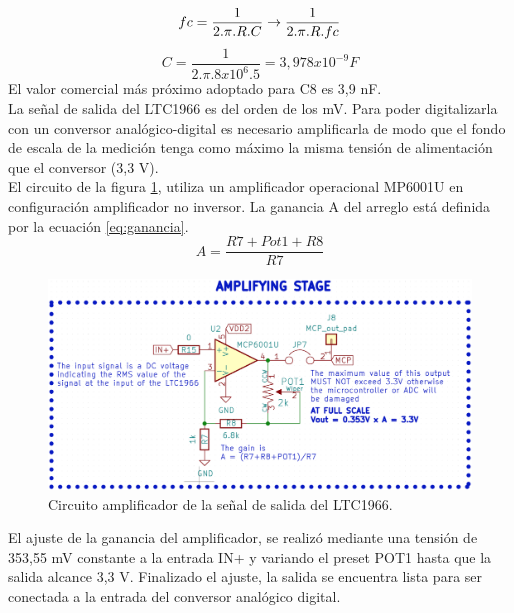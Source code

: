 \begin{equation}
	fc = \frac{1}{2.\pi.R.C}\rightarrow\frac{1}{2.\pi.R.fc}\\
\end{equation}
\begin{equation}
	\label{eq_capacitor_hpf}
	C=\frac{1}{2.\pi.{8x10^6}.5}=3,978x10^{-9} F
\end{equation}
El valor comercial más próximo adoptado para C8 es 3,9 nF.\\
La señal de salida del LTC1966 es del orden de los mV. Para poder digitalizarla con un conversor analógico-digital es necesario amplificarla de modo que el fondo de escala de la medición tenga como máximo la misma tensión de alimentación que el conversor (3,3 V).\\
El circuito de la figura \ref{fig:ctoopamp}, utiliza un amplificador operacional MP6001U \citep{mcp6001} en configuración amplificador no inversor. La ganancia A del arreglo est\'{a} definida por la ecuación \ref{eq:ganancia}.
\begin{equation}
\label{eq:ganancia}
	A=\frac{R7+Pot1+R8}{R7}
\end{equation}

\begin{figure}[h!]
	\centering
	\includegraphics[width=1.0\linewidth]{Figures/cto_op_amp}
	\caption{Circuito amplificador de la señal de salida del LTC1966.}
	\label{fig:ctoopamp}
\end{figure}
El ajuste de la ganancia del amplificador, se realiz\'{o} mediante una tensión de 353,55 mV constante a la entrada IN+ y variando el preset POT1 hasta que la salida alcance 3,3 V. Finalizado el ajuste, la salida se encuentra lista para ser conectada a la entrada del conversor analógico digital.\\

